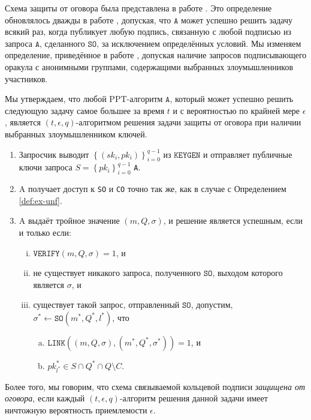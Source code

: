 \documentclass{llncs}
\newcommand{\A}{\texttt{A}}
\begin{document}
Схема защиты от оговора была представлена в работе \cite{tsang2004separable}. Это определение обновлялось дважды в работе \cite{au2006short}, допуская, что $\A$ может успешно решить задачу всякий раз, когда публикует любую подпись, связанную с любой подписью из запроса $\A$, сделанного $\texttt{SO}$, за исключением определённых условий. Мы изменяем определение, приведённое в работе \cite{au2006short}, допуская наличие запросов подписывающего оракула с анонимными группами, содержащими выбранных злоумышленников участников.

\begin{definition}\label{def:acst-nonsl}
Мы утверждаем, что любой PPT-алгоритм $\A$, который может успешно решить следующую задачу самое большее за время $t$ и с вероятностью по крайней мере $\epsilon$, является $(t, \epsilon, q)$-алгоритмом решения задачи защиты от оговора при наличии выбранных злоумышленником ключей.
\begin{enumerate}
\item Запросчик выводит $\left\{(sk_i, pk_i)\right\}_{i=0}^{q-1}$ из $\texttt{KEYGEN}$ и отправляет публичные ключи запроса $S = \left\{pk_i\right\}_{i=0}^{q-1}$ \A.

\item A получает доступ к \texttt{SO} и \texttt{CO} точно так же, как в случае с Определением \ref{def:ex-unf}.

\item A выдаёт тройное значение $(m, Q, \sigma)$, и решение является успешным, если и только если:
    \begin{enumerate}[(i)]
    \item $\texttt{VERIFY}(m, Q, \sigma) = 1$, и

    \item не существует никакого запроса, полученного $\texttt{SO}$, выходом которого является $\sigma$, и

    \item существует такой запрос, отправленный $\texttt{SO}$, допустим, $\sigma^* \leftarrow \texttt{SO}(m^*, Q^*, l^*)$, что
        \begin{enumerate}[(a)]
        \item $\texttt{LINK}((m, Q, \sigma), (m^*, Q^*, \sigma^*)) = 1$, и

        \item $pk^*_{l^*} \in S \cap Q^* \cap Q \setminus C$.
        \end{enumerate}
    \end{enumerate}
\end{enumerate}
Более того, мы говорим, что схема связываемой кольцевой подписи \textit{защищена от оговора}, если каждый $(t, \epsilon, q)$-алгоритм решения данной задачи имеет ничтожную вероятность приемлемости $\epsilon$.
\end{definition}
\end{document}
